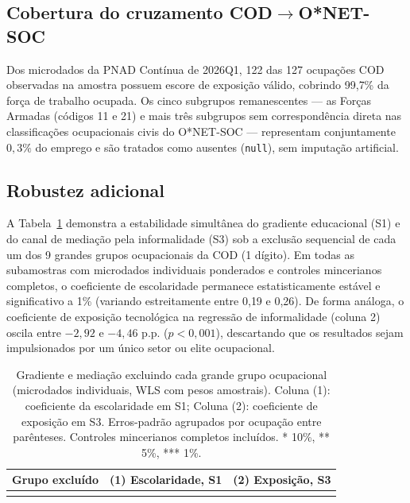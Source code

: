 \subsection{Cobertura do cruzamento \texorpdfstring{COD$\to$O*NET-SOC}{COD para O*NET-SOC}}

Dos microdados da PNAD Contínua de 2026Q1, 122 das 127 ocupações COD observadas na amostra possuem escore de exposição válido, cobrindo 99{,}7\% da força de trabalho ocupada. Os cinco subgrupos remanescentes --- as Forças Armadas (códigos 11 e 21) e mais três subgrupos sem correspondência direta nas classificações ocupacionais civis do O*NET-SOC --- representam conjuntamente $0{,}3\%$ do emprego e são tratados como ausentes (\texttt{null}), sem imputação artificial.

\subsection{Robustez adicional}
\label{ap:robustez}

A Tabela~\ref{tab:robustezgrupos} demonstra a estabilidade simultânea do gradiente educacional (S1) e do canal de mediação pela informalidade (S3) sob a exclusão sequencial de cada um dos 9 grandes grupos ocupacionais da COD (1 dígito). Em todas as subamostras com microdados individuais ponderados e controles mincerianos completos, o coeficiente de escolaridade permanece estatisticamente estável e significativo a 1\% (variando estreitamente entre 0{,}19 e 0{,}26). De forma análoga, o coeficiente de exposição tecnológica na regressão de informalidade (coluna 2) oscila entre $-2{,}92$ e $-4{,}46$ p.p. ($p < 0{,}001$), descartando que os resultados sejam impulsionados por um único setor ou elite ocupacional.

\begin{table}[htbp]
\centering
\small
\caption{Gradiente e mediação excluindo cada grande grupo ocupacional (microdados individuais, WLS com pesos amostrais). Coluna (1): coeficiente da escolaridade em S1; Coluna (2): coeficiente de exposição em S3. Erros-padrão agrupados por ocupação entre parênteses. Controles mincerianos completos incluídos. * 10\%, ** 5\%, *** 1\%.}
\label{tab:robustezgrupos}
\begin{tabular}{lcc}
\toprule
Grupo excluído & (1) Escolaridade, S1 & (2) Exposição, S3 \\
\midrule
 \\
\bottomrule
\end{tabular}
\end{table}
